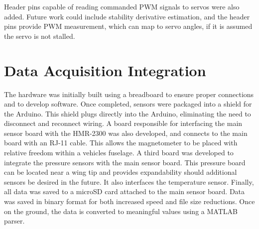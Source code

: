 Header pins capable of reading commanded PWM signals to servos were also added. Future work could include stability derivative estimation, and the header pins provide PWM measurement, which can map to servo angles, if it is assumed the servo is not stalled. 

\section{Data Acquisition Integration}
The hardware was initially built using a breadboard to ensure proper connections and to develop software. Once completed, sensors were packaged into a shield for the Arduino. This shield plugs directly into the Arduino, eliminating the need to disconnect and reconnect wiring. A board responsible for interfacing the main sensor board with the HMR-2300 was also developed, and connects to the main board with an RJ-11 cable. This allows the magnetometer to be placed with relative freedom within a vehicles fuselage. A third board was developed to integrate the pressure sensors with the main sensor board. This pressure board can be located near a wing tip and  provides expandability should additional sensors be desired in the future. It also interfaces the temperature sensor. Finally, all data was saved to a microSD card attached to the main sensor board. Data was saved in binary format for both increased speed and file size reductions. Once on the ground, the data is converted to meaningful values using a MATLAB parser.

